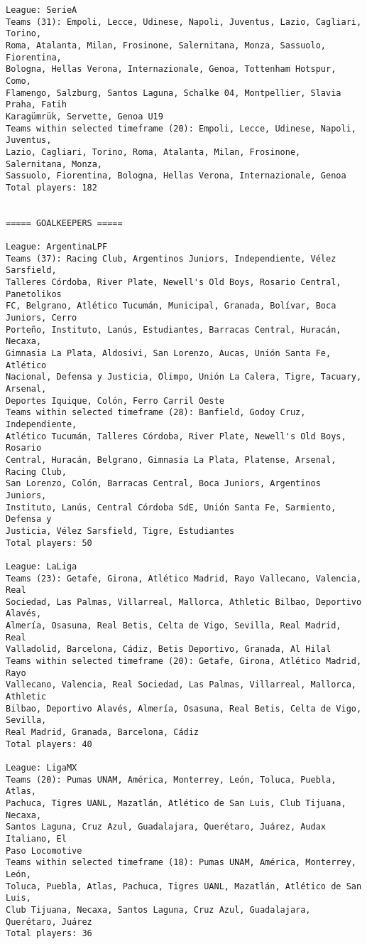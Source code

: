 \documentclass[11pt]{article}
\begin{document}
\begin{Verbatim}[commandchars=\\\{\}]
League: SerieA
Teams (31): Empoli, Lecce, Udinese, Napoli, Juventus, Lazio, Cagliari, Torino,
Roma, Atalanta, Milan, Frosinone, Salernitana, Monza, Sassuolo, Fiorentina,
Bologna, Hellas Verona, Internazionale, Genoa, Tottenham Hotspur, Como,
Flamengo, Salzburg, Santos Laguna, Schalke 04, Montpellier, Slavia Praha, Fatih
Karagümrük, Servette, Genoa U19
Teams within selected timeframe (20): Empoli, Lecce, Udinese, Napoli, Juventus,
Lazio, Cagliari, Torino, Roma, Atalanta, Milan, Frosinone, Salernitana, Monza,
Sassuolo, Fiorentina, Bologna, Hellas Verona, Internazionale, Genoa
Total players: 182


===== GOALKEEPERS =====

League: ArgentinaLPF
Teams (37): Racing Club, Argentinos Juniors, Independiente, Vélez Sarsfield,
Talleres Córdoba, River Plate, Newell's Old Boys, Rosario Central, Panetolikos
FC, Belgrano, Atlético Tucumán, Municipal, Granada, Bolívar, Boca Juniors, Cerro
Porteño, Instituto, Lanús, Estudiantes, Barracas Central, Huracán, Necaxa,
Gimnasia La Plata, Aldosivi, San Lorenzo, Aucas, Unión Santa Fe, Atlético
Nacional, Defensa y Justicia, Olimpo, Unión La Calera, Tigre, Tacuary, Arsenal,
Deportes Iquique, Colón, Ferro Carril Oeste
Teams within selected timeframe (28): Banfield, Godoy Cruz, Independiente,
Atlético Tucumán, Talleres Córdoba, River Plate, Newell's Old Boys, Rosario
Central, Huracán, Belgrano, Gimnasia La Plata, Platense, Arsenal, Racing Club,
San Lorenzo, Colón, Barracas Central, Boca Juniors, Argentinos Juniors,
Instituto, Lanús, Central Córdoba SdE, Unión Santa Fe, Sarmiento, Defensa y
Justicia, Vélez Sarsfield, Tigre, Estudiantes
Total players: 50

League: LaLiga
Teams (23): Getafe, Girona, Atlético Madrid, Rayo Vallecano, Valencia, Real
Sociedad, Las Palmas, Villarreal, Mallorca, Athletic Bilbao, Deportivo Alavés,
Almería, Osasuna, Real Betis, Celta de Vigo, Sevilla, Real Madrid, Real
Valladolid, Barcelona, Cádiz, Betis Deportivo, Granada, Al Hilal
Teams within selected timeframe (20): Getafe, Girona, Atlético Madrid, Rayo
Vallecano, Valencia, Real Sociedad, Las Palmas, Villarreal, Mallorca, Athletic
Bilbao, Deportivo Alavés, Almería, Osasuna, Real Betis, Celta de Vigo, Sevilla,
Real Madrid, Granada, Barcelona, Cádiz
Total players: 40

League: LigaMX
Teams (20): Pumas UNAM, América, Monterrey, León, Toluca, Puebla, Atlas,
Pachuca, Tigres UANL, Mazatlán, Atlético de San Luis, Club Tijuana, Necaxa,
Santos Laguna, Cruz Azul, Guadalajara, Querétaro, Juárez, Audax Italiano, El
Paso Locomotive
Teams within selected timeframe (18): Pumas UNAM, América, Monterrey, León,
Toluca, Puebla, Atlas, Pachuca, Tigres UANL, Mazatlán, Atlético de San Luis,
Club Tijuana, Necaxa, Santos Laguna, Cruz Azul, Guadalajara, Querétaro, Juárez
Total players: 36


\end{Verbatim}
\end{document}
